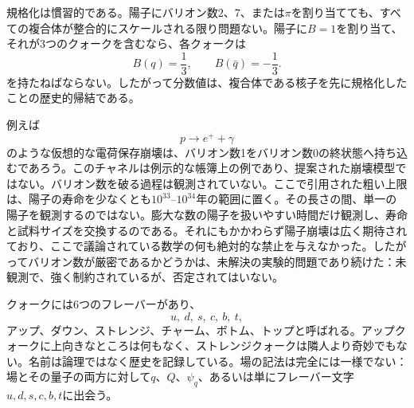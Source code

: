 規格化は慣習的である。陽子にバリオン数\(2\)、\(7\)、または\(\pi\)を割り当てても、すべての複合体が整合的にスケールされる限り問題ない。陽子に\(B=1\)を割り当て、それが3つのクォークを含むなら、各クォークは
\begin{equation}
B(q)=\frac13,
\qquad
B(\bar q)=-\frac13.
\end{equation}
を持たねばならない。したがって分数値は、複合体である核子を先に規格化したことの歴史的帰結である。

\begin{classroomqa}
\end{classroomqa}

例えば
\begin{equation}
p\longrightarrow e^++\gamma
\end{equation}
のような仮想的な電荷保存崩壊は、バリオン数1をバリオン数0の終状態へ持ち込むであろう。このチャネルは例示的な帳簿上の例であり、提案された崩壊模型ではない。バリオン数を破る過程は観測されていない。ここで引用された粗い上限は、陽子の寿命を少なくとも\(10^{33}\)--\(10^{34}\)年の範囲に置く。その長さの間、単一の陽子を観測するのではない。膨大な数の陽子を扱いやすい時間だけ観測し、寿命と試料サイズを交換するのである。それにもかかわらず陽子崩壊は広く期待されており、ここで議論されている数学の何も絶対的な禁止を与えなかった。したがってバリオン数が厳密であるかどうかは、未解決の実験的問題であり続けた：未観測で、強く制約されているが、否定されてはいない。

\begin{classroomqa}
\end{classroomqa}

クォークには6つのフレーバーがあり、
\begin{equation}
u,\ d,\ s,\ c,\ b,\ t,
\end{equation}
アップ、ダウン、ストレンジ、チャーム、ボトム、トップと呼ばれる。アップクォークに上向きなところは何もなく、ストレンジクォークは隣人より奇妙でもない。名前は論理ではなく歴史を記録している。場の記法は完全には一様でない：場とその量子の両方に対して\(q\)、\(Q\)、\(\psi_q\)、あるいは単にフレーバー文字\(u,d,s,c,b,t\)に出会う。

